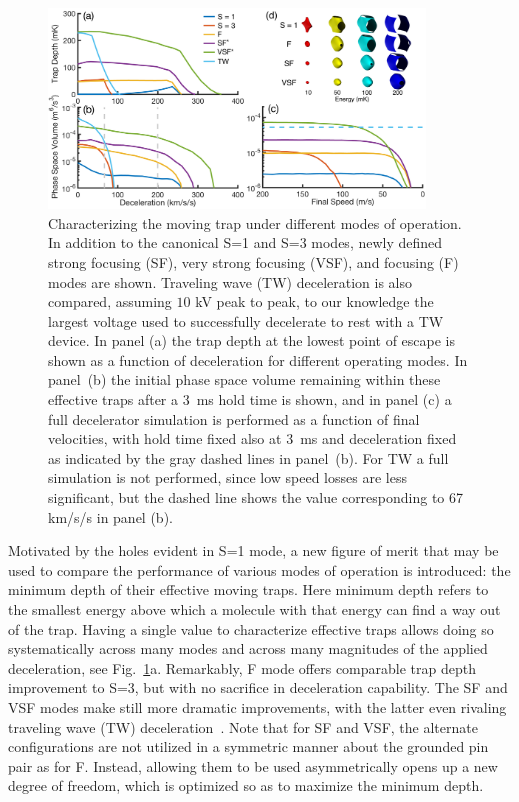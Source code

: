 \begin{figure}[t!]
\includegraphics[width=10cm]{Slowing/full-three-panel.png}%
\vspace{-5pt}
\caption{
Characterizing the moving trap under different modes of operation. In addition to the canonical S=1 and S=3 modes, newly defined strong focusing (SF), very strong focusing (VSF), and focusing (F) modes are shown. Traveling wave (TW) deceleration is also compared, assuming $10$ kV peak to peak, to our knowledge the largest voltage used to successfully decelerate to rest with a TW device. In panel (a) the trap depth at the lowest point of escape is shown as a function of deceleration for different operating modes. In panel~(b) the initial phase space volume remaining within these effective traps after a $3$~ms hold time is shown, and in panel (c) a full decelerator simulation is performed as a function of final velocities, with hold time fixed also at $3$~ms and deceleration fixed as indicated by the gray dashed lines in panel~(b). For TW a full simulation is not performed, since low speed losses are less significant, but the dashed line shows the value corresponding to 67 km/s/s in panel (b).\vspace{-4mm}}
\label{fig:efftrap}
\end{figure}

Motivated by the holes evident in S=1 mode, a new figure of merit that may be used to compare the performance of various modes of operation is introduced: the minimum depth of their effective moving traps.
Here minimum depth refers to the smallest energy above which a molecule with that energy can find a way out of the trap.
Having a single value to characterize effective traps allows doing so systematically across many modes and across many magnitudes of the applied deceleration, see Fig.~\ref{fig:efftrap}a. Remarkably, F mode offers comparable trap depth improvement to S=3, but with no sacrifice in deceleration capability. 
The SF and VSF modes make still more dramatic improvements, with the latter even rivaling traveling wave (TW) deceleration~\cite{Osterwalder2010}. 
Note that for SF and VSF, the alternate configurations are not utilized in a symmetric manner about the grounded pin pair as for F. 
Instead, allowing them to be used asymmetrically opens up a new degree of freedom, which is optimized so as to maximize the minimum depth.

